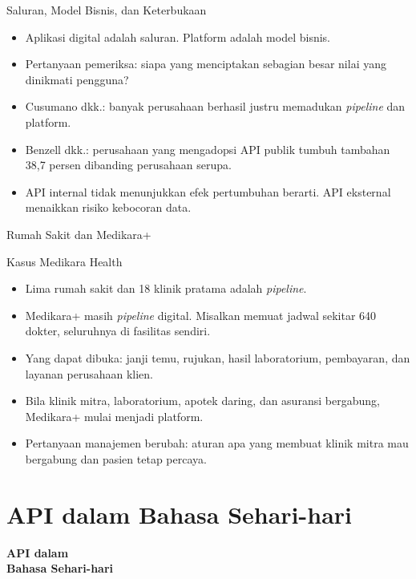 \documentclass[aspectratio=169, table, 12pt]{beamer}
\begin{document}
\begin{frame}{{\Large Saluran, Model Bisnis, dan Keterbukaan}}
  \vspace{6pt}
  \begin{itemize}
    \item Aplikasi digital adalah saluran. Platform adalah model bisnis.
    \item Pertanyaan pemeriksa: siapa yang menciptakan sebagian besar nilai yang dinikmati pengguna?
    \item Cusumano dkk.: banyak perusahaan berhasil justru memadukan \textit{pipeline} dan platform.
    \item Benzell dkk.: perusahaan yang mengadopsi API publik tumbuh tambahan 38,7 persen dibanding perusahaan serupa.
    \item API internal tidak menunjukkan efek pertumbuhan berarti. API eksternal menaikkan risiko kebocoran data.
  \end{itemize}
\end{frame}

\begin{frame}{{\Large Rumah Sakit dan Medikara+}}
  \begin{block}{Kasus Medikara Health}
    \small
    \begin{itemize}
      \item Lima rumah sakit dan 18 klinik pratama adalah \textit{pipeline}.
      \item Medikara+ masih \textit{pipeline} digital. Misalkan memuat jadwal sekitar 640 dokter, seluruhnya di fasilitas sendiri.
      \item Yang dapat dibuka: janji temu, rujukan, hasil laboratorium, pembayaran, dan layanan perusahaan klien.
      \item Bila klinik mitra, laboratorium, apotek daring, dan asuransi bergabung, Medikara+ mulai menjadi platform.
      \item Pertanyaan manajemen berubah: aturan apa yang membuat klinik mitra mau bergabung dan pasien tetap percaya.
    \end{itemize}
  \end{block}
\end{frame}

\section{API dalam Bahasa Sehari-hari}

\begin{frame}{\hfill}
  \centering
  \Huge{\textbf{API dalam\\Bahasa Sehari-hari}}
\end{frame}
\end{document}
